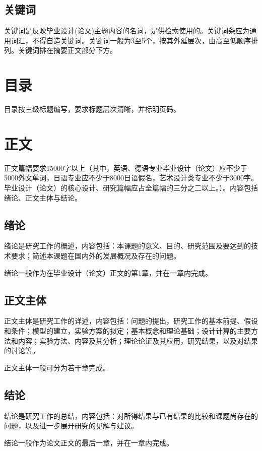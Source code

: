 \subsection{关键词}
\par 关键词是反映毕业设计(论文)主题内容的名词，是供检索使用的。关键词条应为通用词汇，不得自造关键词。关键词一般为3至5个，按其外延层次，由高至低顺序排列。关键词排在摘要正文部分下方。

\section{目录}
\par 目录按三级标题编写，要求标题层次清晰，并标明页码。

\section{正文}
\par 正文篇幅要求15000字以上（其中，英语、德语专业毕业设计（论文）应不少于5000外文单词，日语专业应不少于8000日语假名，艺术设计类专业不少于3000字。毕业设计（论文）的核心设计、研究篇幅应占全篇幅的三分之二以上。）。内容包括绪论、正文主体与结论。

\subsection{绪论}
\par 绪论是研究工作的概述，内容包括：本课题的意义、目的、研究范围及要达到的技术要求；简述本课题在国内外的发展概况及存在的问题。
\par 绪论一般作为在毕业设计（论文）正文的第1章，并在一章内完成。

\subsection{正文主体}
\par 正文主体是研究工作的详述，内容包括：问题的提出，研究工作的基本前提、假设和条件；模型的建立，实验方案的拟定；基本概念和理论基础；设计计算的主要方法和内容；实验方法、内容及其分析；理论论证及其应用，研究结果，以及对结果的讨论等。
\par 正文主体一般可分为若干章完成。

\subsection{结论}
\par 结论是研究工作的总结，内容包括：对所得结果与已有结果的比较和课题尚存在的问题，以及进一步展开研究的见解与建议。
\par 结论一般作为论文正文的最后一章，并在一章内完成。

